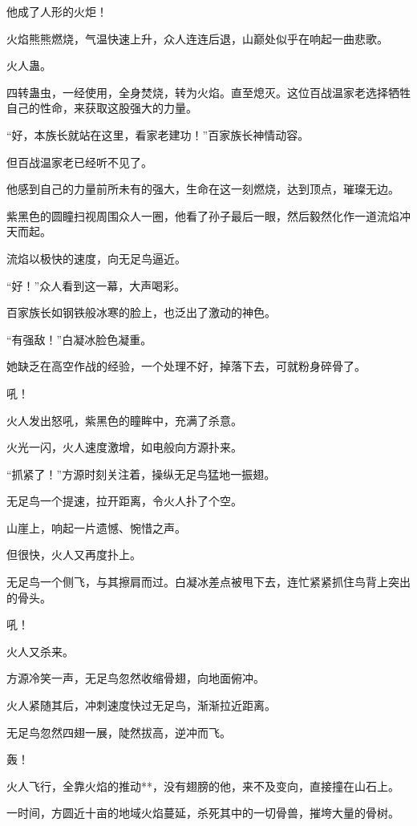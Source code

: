 \begin{this_body}
他成了人形的火炬！

火焰熊熊燃烧，气温快速上升，众人连连后退，山巅处似乎在响起一曲悲歌。

火人蛊。

四转蛊虫，一经使用，全身焚烧，转为火焰。直至熄灭。这位百战温家老选择牺牲自己的性命，来获取这股强大的力量。

“好，本族长就站在这里，看家老建功！”百家族长神情动容。

但百战温家老已经听不见了。

他感到自己的力量前所未有的强大，生命在这一刻燃烧，达到顶点，璀璨无边。

紫黑色的圆瞳扫视周围众人一圈，他看了孙子最后一眼，然后毅然化作一道流焰冲天而起。

流焰以极快的速度，向无足鸟逼近。

“好！”众人看到这一幕，大声喝彩。

百家族长如钢铁般冰寒的脸上，也泛出了激动的神色。

“有强敌！”白凝冰脸色凝重。

她缺乏在高空作战的经验，一个处理不好，掉落下去，可就粉身碎骨了。

吼！

火人发出怒吼，紫黑色的瞳眸中，充满了杀意。

火光一闪，火人速度激增，如电般向方源扑来。

“抓紧了！”方源时刻关注着，操纵无足鸟猛地一振翅。

无足鸟一个提速，拉开距离，令火人扑了个空。

山崖上，响起一片遗憾、惋惜之声。

但很快，火人又再度扑上。

无足鸟一个侧飞，与其擦肩而过。白凝冰差点被甩下去，连忙紧紧抓住鸟背上突出的骨头。

吼！

火人又杀来。

方源冷笑一声，无足鸟忽然收缩骨翅，向地面俯冲。

火人紧随其后，冲刺速度快过无足鸟，渐渐拉近距离。

无足鸟忽然四翅一展，陡然拔高，逆冲而飞。

轰！

火人飞行，全靠火焰的推动**，没有翅膀的他，来不及变向，直接撞在山石上。

一时间，方圆近十亩的地域火焰蔓延，杀死其中的一切骨兽，摧垮大量的骨树。


\end{this_body}
